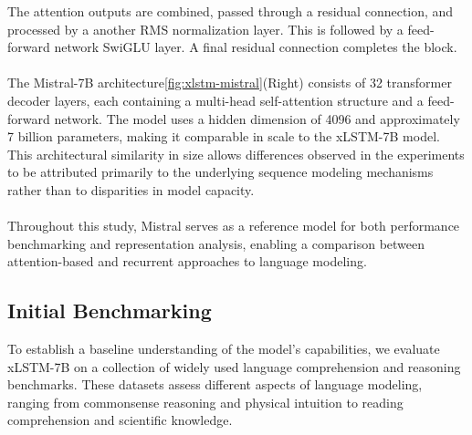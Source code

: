 \noindent The attention outputs are combined, passed through a residual connection, and processed by a 
another RMS normalization layer. This is followed by a feed-forward network SwiGLU layer. A final residual 
connection completes the block. \\ \\ 
%
The Mistral-7B architecture\ref{fig:xlstm-mistral}(Right) consists of 32 transformer decoder layers, each containing a multi-head self-attention
structure and a feed-forward network. The model uses a hidden dimension of 4096 and approximately 7 billion parameters, 
making it comparable in scale to the xLSTM-7B model. This architectural similarity in size allows differences observed 
in the experiments to be attributed primarily to the underlying sequence modeling mechanisms rather than to disparities 
in model capacity. \\ \\
%
Throughout this study, Mistral serves as a reference model for both performance benchmarking and representation 
analysis, enabling a comparison between attention-based and recurrent approaches to language modeling.


\subsection{Initial Benchmarking}\label{subsection:baseline-eval}
To establish a baseline understanding of the model's capabilities, we evaluate xLSTM-7B on a collection of widely used language 
comprehension and reasoning benchmarks. These datasets assess different aspects of language modeling, ranging from commonsense 
reasoning and physical intuition to reading comprehension and scientific knowledge.

